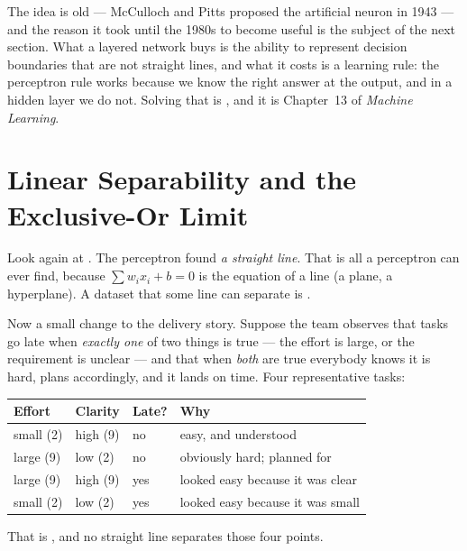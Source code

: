 The idea is old --- McCulloch and Pitts proposed the artificial neuron in 1943 ---
and the reason it took until the 1980s to become useful is the subject of the next
section. What a layered network buys is the ability to represent decision boundaries
that are not straight lines, and what it costs is a learning rule: the perceptron
rule works because we know the right answer at the output, and in a hidden layer we
do not. Solving that is , and it is Chapter~13 of
\emph{Machine Learning}.

\section{Linear Separability and the Exclusive-Or Limit}

Look again at . The perceptron found \emph{a straight line}. That
is all a perceptron can ever find, because $\sum w_{i}x_{i} + b = 0$ is the equation
of a line (a plane, a hyperplane). A dataset that some line can separate is
.

Now a small change to the delivery story. Suppose the team observes that tasks go
late when \emph{exactly one} of two things is true --- the effort is large, or the
requirement is unclear --- and that when \emph{both} are true everybody knows it is
hard, plans accordingly, and it lands on time. Four representative tasks:

\smallskip
\noindent\begin{tabular}{@{}L{2.4cm}L{2.4cm}L{2.4cm}L{6.0cm}@{}}
\toprule
\textbf{Effort} & \textbf{Clarity} & \textbf{Late?} & \textbf{Why} \\
\midrule
small (2) & high (9) & no & easy, and understood \\
large (9) & low (2) & no & obviously hard; planned for \\
large (9) & high (9) & yes & looked easy because it was clear \\
small (2) & low (2) & yes & looked easy because it was small \\
\bottomrule
\end{tabular}

\smallskip
That is , and no straight line separates those four points.

